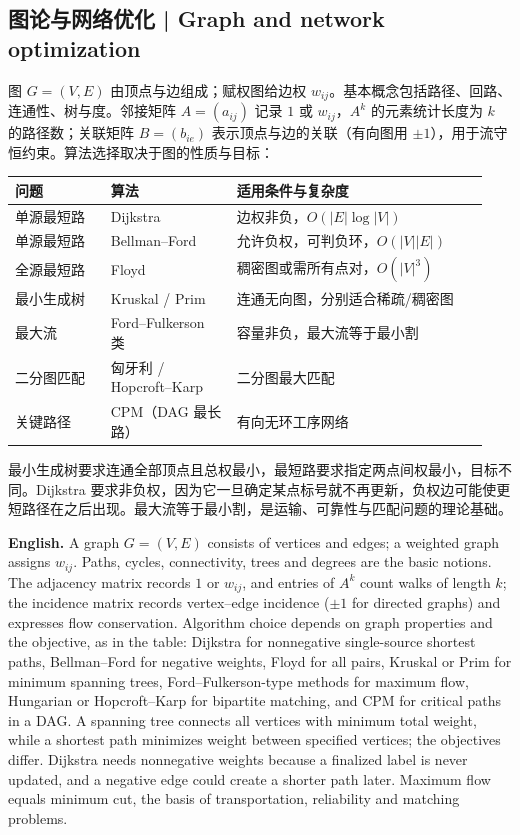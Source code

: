 \documentclass[UTF8,11pt,a4paper]{ctexart}
\newcommand{\EN}[1]{\par\noindent\textbf{English.} #1\par}
\begin{document}
\subsection{图论与网络优化 | Graph and network optimization}
图 $G=(V,E)$ 由顶点与边组成；赋权图给边权 $w_{ij}$。基本概念包括路径、回路、连通性、树与度。邻接矩阵 $A=(a_{ij})$ 记录 $1$ 或 $w_{ij}$，$A^k$ 的元素统计长度为 $k$ 的路径数；关联矩阵 $B=(b_{ie})$ 表示顶点与边的关联（有向图用 $\pm1$），用于流守恒约束。算法选择取决于图的性质与目标：
\begin{center}\small
\begin{tabular}{@{}p{0.19\linewidth}p{0.25\linewidth}p{0.50\linewidth}@{}}
\hline
问题 & 算法 & 适用条件与复杂度 \\
\hline
单源最短路 & Dijkstra & 边权非负，$O(|E|\log|V|)$ \\
单源最短路 & Bellman--Ford & 允许负权，可判负环，$O(|V||E|)$ \\
全源最短路 & Floyd & 稠密图或需所有点对，$O(|V|^3)$ \\
最小生成树 & Kruskal / Prim & 连通无向图，分别适合稀疏/稠密图 \\
最大流 & Ford--Fulkerson 类 & 容量非负，最大流等于最小割 \\
二分图匹配 & 匈牙利 / Hopcroft--Karp & 二分图最大匹配 \\
关键路径 & CPM（DAG 最长路） & 有向无环工序网络 \\
\hline
\end{tabular}
\end{center}
最小生成树要求连通全部顶点且总权最小，最短路要求指定两点间权最小，目标不同。Dijkstra 要求非负权，因为它一旦确定某点标号就不再更新，负权边可能使更短路径在之后出现。最大流等于最小割，是运输、可靠性与匹配问题的理论基础。
\EN{A graph $G=(V,E)$ consists of vertices and edges; a weighted graph assigns $w_{ij}$. Paths, cycles, connectivity, trees and degrees are the basic notions. The adjacency matrix records $1$ or $w_{ij}$, and entries of $A^k$ count walks of length $k$; the incidence matrix records vertex--edge incidence ($\pm1$ for directed graphs) and expresses flow conservation. Algorithm choice depends on graph properties and the objective, as in the table: Dijkstra for nonnegative single-source shortest paths, Bellman--Ford for negative weights, Floyd for all pairs, Kruskal or Prim for minimum spanning trees, Ford--Fulkerson-type methods for maximum flow, Hungarian or Hopcroft--Karp for bipartite matching, and CPM for critical paths in a DAG. A spanning tree connects all vertices with minimum total weight, while a shortest path minimizes weight between specified vertices; the objectives differ. Dijkstra needs nonnegative weights because a finalized label is never updated, and a negative edge could create a shorter path later. Maximum flow equals minimum cut, the basis of transportation, reliability and matching problems.}
\end{document}
